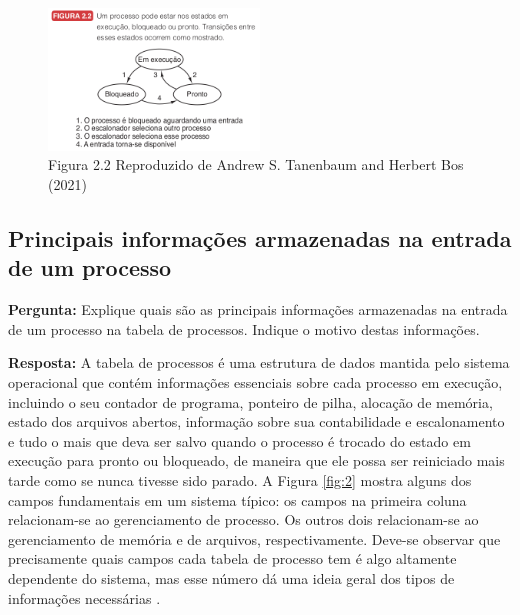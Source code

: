 \documentclass{article}
\begin{document}
\begin{figure}[h] %
    \centering %
    \includegraphics[width=0.5\textwidth]{Images/imageLivroEstadoProcessos.png}
    \caption{Figura 2.2 Reproduzido de Andrew S. Tanenbaum and Herbert Bos (2021) \cite{tanenbaum2021}}
    \label{fig:1} %
\end{figure}

\subsection{Principais informações armazenadas na entrada de um processo}
\textbf{Pergunta:} Explique quais são as principais informações armazenadas na entrada de um processo na tabela de processos. Indique o motivo destas informações.\newline

\textbf{Resposta:} A tabela de processos é uma estrutura de dados mantida pelo sistema operacional que contém informações essenciais sobre cada processo em execução, incluindo o seu contador de programa, ponteiro de pilha, alocação de memória, estado dos arquivos abertos, informação sobre sua contabilidade e escalonamento e tudo o mais que deva ser salvo quando
o processo é trocado do estado em execução para pronto ou bloqueado, de maneira que ele possa ser reiniciado mais tarde como se nunca tivesse sido parado. A Figura \ref{fig:2} \cite{tanenbaum2021} mostra alguns dos campos fundamentais em um sistema típico: os campos na primeira coluna relacionam-se ao gerenciamento de processo. Os outros dois relacionam-se ao gerenciamento de memória e de arquivos, respectivamente. Deve-se observar que precisamente quais campos cada tabela de processo tem é algo altamente dependente do sistema, mas esse número dá uma ideia geral dos tipos de informações necessárias \cite{tanenbaum2021}.
\end{document}
